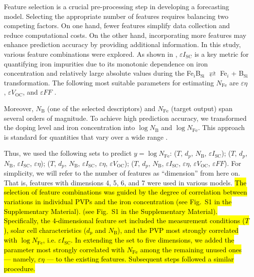 \documentclass[a4paper,fleqn,draft]{cas-sc}
\begin{document}
Feature selection is a crucial pre-processing step in developing a forecasting model.
Selecting the appropriate number of features requires balancing two competing factors.
On one hand, fewer features simplify data collection and reduce computational costs.
On the other hand, incorporating more features may enhance prediction accuracy by providing additional information.
In this study, various feature combinations were explored.
As shown in \cite{Olikh2025MSEB}, $\varepsilon I_\mathrm{SC}$ is a key metric for quantifying iron impurities
due to its monotonic dependence on iron concentration and relatively large absolute values during the
Fe$_i$B$_\mathrm{Si}$ $\rightleftarrows$ Fe$_i$ + B$_\mathrm{Si}$
transformation.
The following most suitable parameters for estimating $N_\mathrm{Fe}$ are
$\varepsilon \eta$, $\varepsilon V_\mathrm{OC}$, and $\varepsilon F\!F$ \cite{Olikh2025MSEB}.

Moreover, $N_\mathrm{B}$ (one of the selected descriptors) and
$N_\mathrm{Fe}$ (target output) span several orders of magnitude.
To achieve high prediction accuracy, we transformed the doping level and iron concentration into
$\log N_\mathrm{B}$ and $\log N_\mathrm{Fe}$.
This approach is standard for quantities that vary over a wide range \cite{Srivastava2023, Minagawa2024}.

Thus, we used the following sets to predict $y = \log N_\mathrm{Fe}$:
($T$, $d_p$, $N_\mathrm{B}$, $\varepsilon I_\mathrm{SC}$);
($T$, $d_p$, $N_\mathrm{B}$, $\varepsilon I_\mathrm{SC}$, $\varepsilon \eta$);
($T$, $d_p$, $N_\mathrm{B}$, $\varepsilon I_\mathrm{SC}$, $\varepsilon \eta$, $\varepsilon V_\mathrm{OC}$);
($T$, $d_p$, $N_\mathrm{B}$, $\varepsilon I_\mathrm{SC}$, $\varepsilon \eta$, $\varepsilon V_\mathrm{OC}$, $\varepsilon F\!F$).
For simplicity, we will refer to the number of features as ``dimension'' from here on.
That is, features with dimensions 4, 5, 6, and 7 were used in various models.
\textcolor[rgb]{1.00,0.07,0.00}{
\hl{
The selection of feature combinations was guided
by the degree of correlation between variations in individual PVPs and the iron concentration (see Fig.~S1 in the Supplementary Material).
(see Fig.~S1 in the Supplementary Material).
Specifically, the 4-dimensional feature set included the measurement conditions ($T$),
solar cell characteristics ($d_p$ and $N_\mathrm{B}$), and the PVP most strongly correlated with $\log N_\mathrm{Fe}$, i.e. $\varepsilon I_\mathrm{SC}$.
In extending the set to five dimensions, we added the parameter most strongly correlated with $N_\mathrm{Fe}$
among the remaining unused ones --- namely,  $\varepsilon \eta$  --- to the existing features.
Subsequent steps followed a similar procedure.
}}
\end{document}
